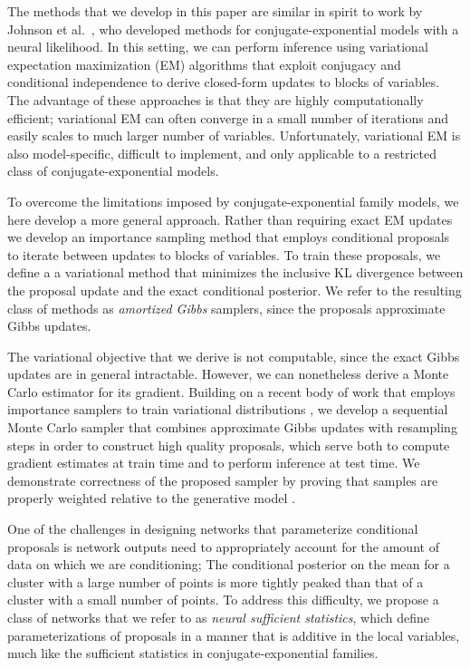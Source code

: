 \documentclass{article}
\theoremstyle{definition}
\begin{document}
The methods that we develop in this paper are similar in spirit to work by Johnson et al.~\cite{johnson2016composing}, who developed methods for  conjugate-exponential models with a neural likelihood. In this setting, we can perform inference using variational expectation maximization (EM) algorithms \cite{beal2003variational,bishop2006pattern,wainwright2008graphical} that exploit conjugacy and conditional independence to derive closed-form updates to blocks of variables. The advantage of these approaches is that they are highly computationally efficient; variational EM can often converge in a small number of iterations and easily scales to much larger number of variables. Unfortunately, variational EM is also model-specific, difficult to implement, and only applicable to a restricted class of conjugate-exponential models.

To overcome the limitations imposed by conjugate-exponential family models, we here develop a more general approach. Rather than requiring exact EM updates we develop an importance sampling method that employs conditional proposals to iterate between updates to blocks of variables. To train these proposals, we define a a variational method that minimizes the inclusive KL divergence between the proposal update and the exact conditional posterior. We refer to the resulting class of methods as \emph{amortized Gibbs} samplers, since the proposals approximate Gibbs updates.

The variational objective that we derive is not computable, since the exact Gibbs updates are in general intractable. However, we can nonetheless derive a Monte Carlo estimator for its gradient. Building on a recent body of work that employs importance samplers to train variational distributions \cite{burda2016importance,le2018auto-encoding,maddison2017filtering,naesseth2018variational}, we develop a sequential Monte Carlo sampler \cite{delmoral2006sequential} that combines approximate Gibbs updates with resampling steps in order to construct high quality proposals, which serve both to compute gradient estimates at train time and to perform inference at test time. We demonstrate correctness of the proposed sampler by  proving that samples are properly weighted relative to the generative model \cite{naesseth2015nested}.

One of the challenges in designing networks that parameterize conditional proposals is network outputs need to appropriately account for the amount of data on which we are conditioning; The conditional posterior on the mean for a cluster with a large number of points is more tightly peaked than that of a cluster with a small number of points. To address this difficulty, we propose a class of networks that we refer to as \emph{neural sufficient statistics}, which define parameterizations of proposals in a manner that is additive in the local variables, much like the sufficient statistics in conjugate-exponential families.
\end{document}
